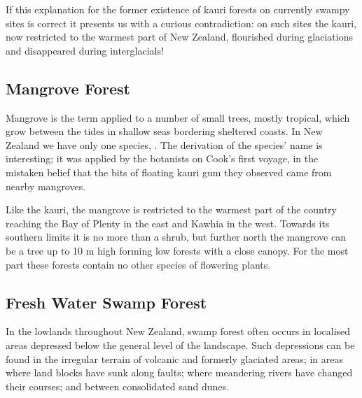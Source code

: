 If this explanation for the former existence of kauri forests on currently swampy sites is correct it presents us with a curious contradiction: on such sites the kauri, now restricted to the warmest part of New Zealand, flourished during glaciations and disappeared during interglacials!

\subsection{Mangrove Forest}

Mangrove is the term applied to a number of small trees, mostly tropical, which grow between the tides in shallow seas bordering sheltered coasts.
In New Zealand we have only one species, .
The derivation of the species' name is interesting; it was applied by the botanists on Cook's first voyage, in the mistaken belief that the bits of floating kauri gum they observed came from nearby mangroves.

Like the kauri, the mangrove is restricted to the warmest part of the country reaching the Bay of Plenty in the east and Kawhia in the west.
Towards its southern limits it is no more than a shrub, but further north the mangrove can be a tree up to 10 m high forming low forests with a close canopy.
For the most part these forests contain no other species of flowering plants.

\subsection{Fresh Water Swamp Forest}

In the lowlands throughout New Zealand, swamp forest often occurs in localised areas depressed below the general level of the landscape.
Such depressions can be found in the irregular terrain of volcanic and formerly glaciated areas; in areas where land blocks have sunk along faults; where meandering rivers have changed their courses; and between consolidated sand dunes.

